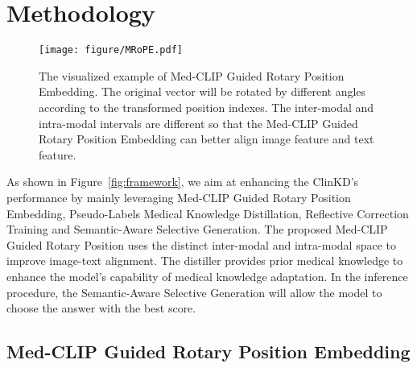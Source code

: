 \section{Methodology}
\begin{figure*}[h]
\centering
\texttt{[image: figure/MRoPE.pdf]} %

\caption{The visualized example of Med-CLIP Guided Rotary Position Embedding. The original vector will be rotated by different angles according to the transformed position indexes. The inter-modal and intra-modal intervals are different so that the Med-CLIP Guided Rotary Position Embedding can better align image feature and text feature.}
\label{fig:3}
\end{figure*}
As shown in Figure~\ref{fig:framework}, we aim at enhancing the ClinKD's performance by mainly leveraging Med-CLIP Guided Rotary Position Embedding, Pseudo-Labels Medical Knowledge Distillation, Reflective Correction Training and Semantic-Aware Selective Generation. The proposed Med-CLIP Guided Rotary Position uses the distinct inter-modal and intra-modal space to improve image-text alignment. The distiller provides prior medical knowledge to enhance the model's capability of medical knowledge adaptation. In the inference procedure, the Semantic-Aware Selective Generation will allow the model to choose the answer with the best score.
\subsection{Med-CLIP Guided Rotary Position Embedding}


